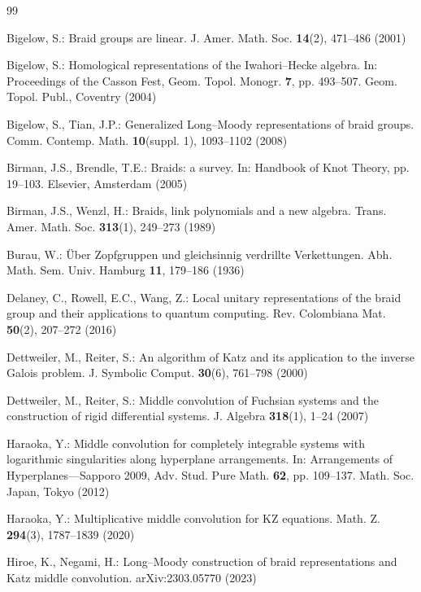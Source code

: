 \documentclass[11pt]{article}
\theoremstyle{definition}
\theoremstyle{remark}
\begin{document}
\begin{thebibliography}{99}

Bigelow, S.: Braid groups are linear. J. Amer. Math. Soc. \textbf{14}(2),
471--486 (2001)

Bigelow, S.: Homological representations of the Iwahori--Hecke algebra.
In: Proceedings of the Casson Fest, Geom. Topol. Monogr. \textbf{7},
pp. 493--507. Geom. Topol. Publ., Coventry (2004)

Bigelow, S., Tian, J.P.: Generalized Long--Moody representations of braid
groups. Comm. Contemp. Math. \textbf{10}(suppl. 1), 1093--1102 (2008)

Birman, J.S., Brendle, T.E.: Braids: a survey. In: Handbook of Knot
Theory, pp. 19--103. Elsevier, Amsterdam (2005)

Birman, J.S., Wenzl, H.: Braids, link polynomials and a new algebra.
Trans. Amer. Math. Soc. \textbf{313}(1), 249--273 (1989)

Burau, W.: \"Uber Zopfgruppen und gleichsinnig verdrillte Verkettungen.
Abh. Math. Sem. Univ. Hamburg \textbf{11}, 179--186 (1936)

Delaney, C., Rowell, E.C., Wang, Z.: Local unitary representations of the
braid group and their applications to quantum computing. Rev. Colombiana
Mat. \textbf{50}(2), 207--272 (2016)

Dettweiler, M., Reiter, S.: An algorithm of Katz and its application to
the inverse Galois problem. J. Symbolic Comput. \textbf{30}(6), 761--798
(2000)

Dettweiler, M., Reiter, S.: Middle convolution of Fuchsian systems and
the construction of rigid differential systems. J. Algebra
\textbf{318}(1), 1--24 (2007)

Haraoka, Y.: Middle convolution for completely integrable systems with
logarithmic singularities along hyperplane arrangements. In: Arrangements
of Hyperplanes---Sapporo 2009, Adv. Stud. Pure Math. \textbf{62},
pp. 109--137. Math. Soc. Japan, Tokyo (2012)

Haraoka, Y.: Multiplicative middle convolution for KZ equations. Math. Z.
\textbf{294}(3), 1787--1839 (2020)

Hiroe, K., Negami, H.: Long--Moody construction of braid representations
and Katz middle convolution. arXiv:2303.05770 (2023)


\end{thebibliography}
\end{document}

